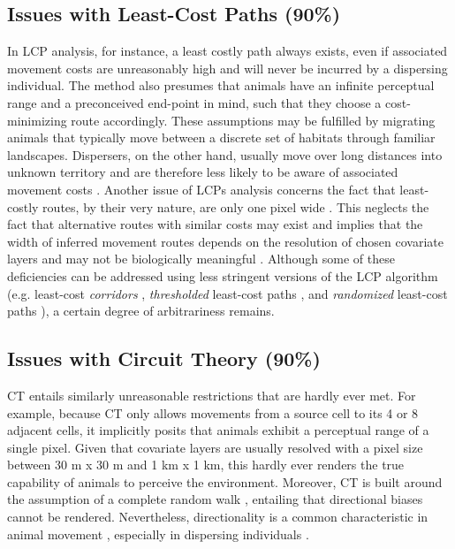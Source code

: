 \documentclass[abstract=on,10pt,a4paper,bibliography=totocnumbered]{article}
\begin{document}
\subsection{Issues with Least-Cost Paths (90\%)}
In LCP analysis, for instance, a least costly path always exists, even if
associated movement costs are unreasonably high and will never be incurred by a
dispersing individual. The method also presumes that animals have an infinite
perceptual range and a preconceived end-point in mind, such that they choose a
cost-minimizing route accordingly. These assumptions may be fulfilled by
migrating animals that typically move between a discrete set of habitats through
familiar landscapes. Dispersers, on the other hand, usually move over long
distances into unknown territory and are therefore less likely to be aware of
associated movement costs \citep{Koen.2014, Abrahms.2017, Cozzi.2020}. Another
issue of LCPs analysis concerns the fact that least-costly routes, by their very
nature, are only one pixel wide \citep{Pinto.2009}. This neglects the fact that
alternative routes with similar costs may exist and implies that the width of
inferred movement routes depends on the resolution of chosen covariate layers
and may not be biologically meaningful \citep{Diniz.2020}. Although some of
these deficiencies can be addressed using less stringent versions of the LCP
algorithm (e.g. least-cost \textit{corridors} \citep{Pinto.2009},
\textit{thresholded} least-cost paths \citep{Landguth.2012}, and
\textit{randomized} least-cost paths \citep{Panzacchi.2016, VanMoorter.2021}), a
certain degree of arbitrariness remains.

\subsection{Issues with Circuit Theory (90\%)}
CT entails similarly unreasonable restrictions that are hardly ever met. For
example, because CT only allows movements from a source cell to its 4 or 8
adjacent cells, it implicitly posits that animals exhibit a perceptual range of
a single pixel. Given that covariate layers are usually resolved with a pixel
size between 30 m x 30 m and 1 km x 1 km, this hardly ever renders the true
capability of animals to perceive the environment. Moreover, CT is built around
the assumption of a complete random walk \citep{Diniz.2020}, entailing that
directional biases cannot be rendered. Nevertheless, directionality is a common
characteristic in animal movement \citep{Bovet.1991, Schultz.2001}, especially
in dispersing individuals \citep{Cozzi.2020, Hofmann.2021}.
\end{document}

